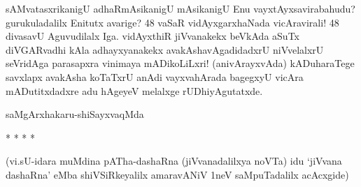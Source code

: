 sAMvatasxrikanigU adhaRmAsikanigU mAsikanigU Enu vayxtAyxsavirabahudu? gurukuladalilx Enitutx\- avarige? 48 vaSaR vidAyxgarxhaNada vicAravirali! 48 diva\-savU Aguvudilalx Iga. vidAyxthiR jiVva\-nakekx beVkAda aSuTx diVGARvadhi kAla adhayx\-yanakekx avakAshavAgadidadxrU niVvelalxrU seVridAga para\-sapxra vini\-maya mADi\-koLiLxri! (anivArayxvAda) kADuharaTege savxlapx avakAsha koTaTxrU anAdi vayxva\-hArada bagegxyU vicAra mADutitxdadxre adu hAgeyeV melalxge rUDhiyAgutatxde. 

\bigskip

\begin{flushright}
saMgArxhakaru-shiSayxvaqMda
\end{flushright}


\begin{center}
* * * *
\end{center}

\medskip

\noindent
(vi.sU-idara muMdina pATha-dashaRna (jiVvanadalilxya noVTa) idu `jiVvana dashaRna' eMba shiVSiRkeyalilx amaravANiV 1neV saMpuTadalilx acAcxgide)
